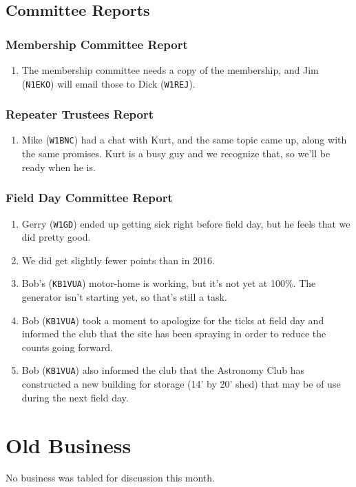 \documentclass[10pt,letterpaper]{article}
\begin{document}
\subsection{Committee Reports}

\subsubsection{Membership Committee Report}
\begin{enumerate}
  \item The membership committee needs a copy of the membership, and Jim (\texttt{N1EKO}) will email those to Dick (\texttt{W1REJ}).
\end{enumerate}

\subsubsection{Repeater Trustees Report}
\begin{enumerate}
  \item Mike (\texttt{W1BNC}) had a chat with Kurt, and the same topic came up, along with the same promises. Kurt is a busy guy and we recognize that, so we'll be ready when he is.
\end{enumerate}

\subsubsection{Field Day Committee Report}
\begin{enumerate}
  \item Gerry (\texttt{W1GD}) ended up getting sick right before field day, but he feels that we did pretty good.
  \item We did get slightly fewer points than in 2016.
  \item Bob's (\texttt{KB1VUA}) motor-home is working, but it's not yet at 100\%. The generator isn't starting yet, so that's still a task.
  \item Bob (\texttt{KB1VUA}) took a moment to apologize for the ticks at field day and informed the club that the site has been spraying in order to reduce the counts going forward.
  \item Bob (\texttt{KB1VUA}) also informed the club that the Astronomy Club has constructed a new building for storage (14' by 20' shed) that may be of use during the next field day.
\end{enumerate}

\section{Old Business}
No business was tabled for discussion this month.
\end{document}
